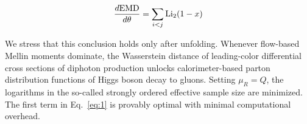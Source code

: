\begin{equation}
  \frac{d \mathrm{EMD}}{d \theta} = \sum_{i<j} \mathrm{Li}_{2}(1 - x)
  \label{eq:3}
\end{equation}

We stress that this conclusion holds only after unfolding. Whenever
flow-based Mellin moments dominate, the Wasserstein distance of
leading-color differential cross sections of diphoton production unlocks
calorimeter-based parton distribution functions of Higgs boson decay to
gluons. Setting $\mu_R = Q$, the logarithms in the so-called strongly
ordered effective sample size are minimized. The first term in
Eq.~\eqref{eq:1} is provably optimal with minimal computational
overhead.

